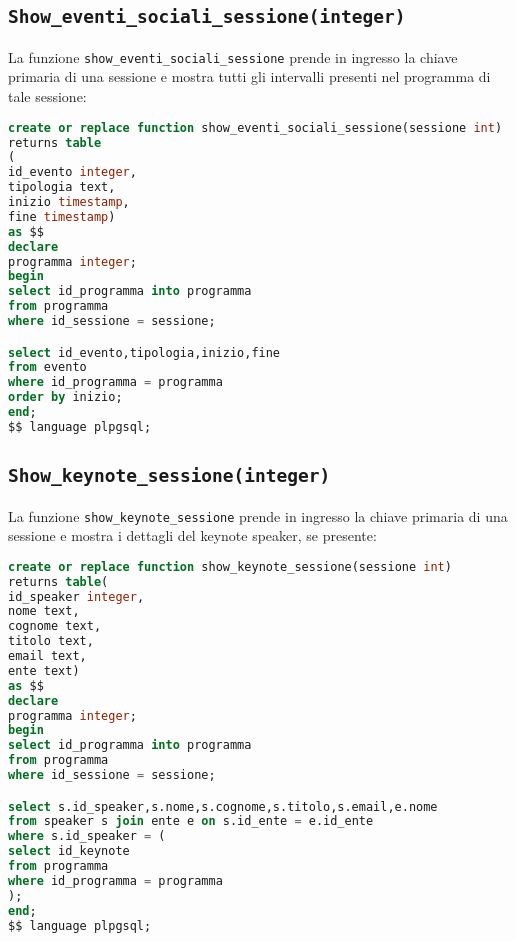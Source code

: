 \subsection{\texttt{Show\_eventi\_sociali\_sessione(integer)}}
La funzione \texttt{show\_eventi\_sociali\_sessione} prende in ingresso la chiave primaria di una sessione e mostra tutti gli intervalli presenti nel programma di tale sessione:
\begin{lstlisting}[language=SQL,style=mystyle]
create or replace function show_eventi_sociali_sessione(sessione int)
returns table
(
id_evento integer,
tipologia text,
inizio timestamp,
fine timestamp) 
as $$
declare 
programma integer;
begin
select id_programma into programma
from programma
where id_sessione = sessione;

select id_evento,tipologia,inizio,fine
from evento
where id_programma = programma
order by inizio;
end;
$$ language plpgsql;
\end{lstlisting}
\subsection{\texttt{Show\_keynote\_sessione(integer)}}
La funzione \texttt{show\_keynote\_sessione} prende in ingresso la chiave primaria di una sessione e mostra i dettagli del keynote speaker, se presente:
\begin{lstlisting}[language=SQL,style=mystyle]
create or replace function show_keynote_sessione(sessione int)
returns table(
id_speaker integer,
nome text,
cognome text,
titolo text,
email text,
ente text) 
as $$
declare 
programma integer;
begin
select id_programma into programma
from programma
where id_sessione = sessione;

select s.id_speaker,s.nome,s.cognome,s.titolo,s.email,e.nome
from speaker s join ente e on s.id_ente = e.id_ente
where s.id_speaker = (
select id_keynote
from programma
where id_programma = programma
);
end;
$$ language plpgsql;
\end{lstlisting}

